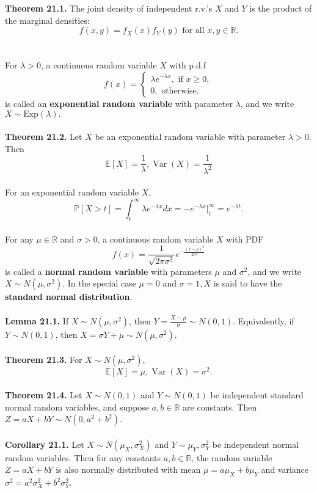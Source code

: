 \documentclass{article}
\theoremstyle{definition}
\DeclareMathOperator{\Var}{Var}
\begin{document}
\textbf{Theorem 21.1.} The joint density of independent r.v.’s $X$ and $Y$ is the product of the marginal densities: $$f(x, y) = f_X(x)f_Y(y) \text{ for all } x, y \in \mathbb{R}.$$ \\ \\
For $\lambda > 0$, a continuous random variable $X$ with p.d.f $$f(x) = \begin{cases}
\lambda e^{-\lambda x}, \text{ if } x \geq 0, \\
0, \text{ otherwise.}
\end{cases}$$ is called an \textbf{exponential random variable} with parameter $\lambda$, and we write $X \sim \text{Exp}(\lambda).$ \\ \\
\textbf{Theorem 21.2.} Let $X$ be an exponential random variable with parameter $\lambda > 0$. Then $$\mathbb{E}[X] = \frac{1}{\lambda}, \Var(X) = \frac{1}{\lambda^2}$$ \\
For an exponential random variable $X$, $$\mathbb{P}[X > t] = \int_t^{\infty} \lambda e^{-\lambda x} dx = -e^{-\lambda x} \biggr|_t^\infty = e^{- \lambda t}.$$ \\
For any $\mu \in \mathbb{R}$ and $\sigma > 0$, a continuous random variable $X$ with PDF $$f(x) = \frac{1}{\sqrt{2 \pi \sigma^2}}e^{-\frac{(x - \mu)^2}{2 \sigma^2}}$$ is called a \textbf{normal random variable} with parameters $\mu$ and $\sigma^2$, and we write $X \sim N(\mu, \sigma^2)$. In the special
case $\mu = 0$ and $\sigma = 1, X$ is said to have the \textbf{standard normal distribution}. \\ \\
\textbf{Lemma 21.1.} If $X \sim N(\mu, \sigma^2)$, then $Y = \frac{X - \mu}{\sigma} \sim N(0, 1)$. Equivalently, if $Y \sim N(0, 1)$, then $X = \sigma Y + \mu \sim N(\mu, \sigma^2)$. \\ \\
\textbf{Theorem 21.3.} For $X \sim N(\mu, \sigma^2)$, $$\mathbb{E}[X] = \mu, \Var(X) = \sigma^2.$$ \\
\textbf{Theorem 21.4.} Let $X \sim N(0, 1)$ and $Y \sim N(0, 1)$ be independent standard normal random variables, and suppose $a, b \in \mathbb{R}$ are constants. Then $Z = aX + bY \sim N(0, a^2 + b^2)$. \\ \\
\textbf{Corollary 21.1.} Let $X \sim N(\mu_X, \sigma_X^2)$ and $Y \sim \mu_Y, \sigma_Y^2$ be independent normal random variables. Then for any constants $a, b \in \mathbb{R}$, the random variable $Z = aX + bY$ is also normally distributed with mean $\mu = a \mu_X +b \mu_Y$ and variance $\sigma^2 = a^2\sigma_X^2 + b^2\sigma_Y^2$. \\ \\
\end{document}

